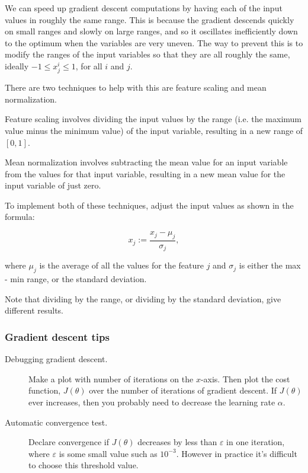 \documentclass[a4paper,11pt]{report}
\begin{document}
We can speed up gradient descent computations by having each of the input values in roughly the same range. This is because the gradient descends quickly on small ranges and slowly on large ranges, and so it oscillates inefficiently down to the optimum when the variables are very uneven.
The way to prevent this is to modify the ranges of the input variables so that they are all roughly the same, ideally $−1\leq x^i_j \leq 1$, for all $i$ and $j$.

There are two techniques to help with this are feature scaling and mean normalization.

Feature scaling involves dividing the input values by the range (i.e. the maximum value minus the minimum value) of the input variable, resulting in a new range of $[0, 1]$.

Mean normalization involves subtracting the mean value for an input variable from the values for that input variable, resulting in a new mean value for the input variable of just zero.

To implement both of these techniques, adjust the input values as shown in the formula:

$$x_j := \dfrac{x_j - \mu_j}{\sigma_j},$$

where $\mu_j$ is the average of all the values for the feature $j$ and $\sigma_j$ is either the max - min range, or the standard deviation.

Note that dividing by the range, or dividing by the standard deviation, give different results.

\subsubsection*{Gradient descent tips}

\begin{description}
  \item[Debugging gradient descent.]  Make a plot with number of iterations on the $x$-axis. Then plot the cost function, $J(\theta)$ over the number of iterations of gradient descent. If $J(\theta)$ ever increases, then you probably need to decrease the learning rate $\alpha$.
  \item[Automatic convergence test.] Declare convergence if $J(\theta)$ decreases by less than $\varepsilon$ in one iteration, where $\varepsilon$ is some small value such as $10^{-3}$. However in practice it's difficult to choose this threshold value.
\end{description}
\end{document}
